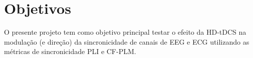 \chapter{Objetivos}
\label{chap:objetivos}

O presente projeto tem como objetivo principal testar o efeito da HD-tDCS na modulação (e direção) da sincronicidade de canais de EEG e ECG utilizando as métricas de sincronicidade PLI e CF-PLM.